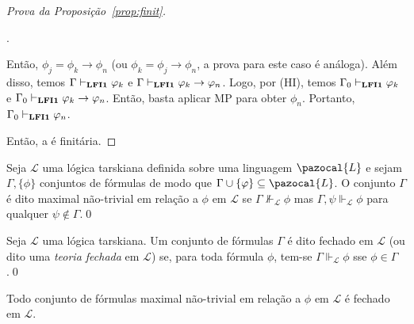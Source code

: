 \begin{proof}[Prova da Proposição~\ref{prop:finit}]
\begin{adjustwidth}{1cm}{}
\begin{provaporcasos}
                    .
                    
                    Então, $\phi_j = \phi_k \to \phi_n$ (ou $\phi_k = \phi_j \to \phi_n$, a prova para este caso é análoga). Além disso, temos $\Gamma \vdash_{{\normalfont\textbf{LFI1}}{}} \varphi_k$ e $\Gamma \vdash_{{\normalfont\textbf{LFI1}}{}} \varphi_k \to \varphi_n$. Logo, por (HI), temos $\Gamma_0 \vdash_{{\normalfont\textbf{LFI1}}{}} \varphi_k$ e $\Gamma_0 \vdash_{{\normalfont\textbf{LFI1}}{}} \varphi_k \to \varphi_n$. Então, basta aplicar MP para obter $\phi_n$. Portanto, $\Gamma_0 \vdash_{{\normalfont\textbf{LFI1}}{}} \varphi_n$.
                \end{provaporcasos}
            \end{adjustwidth}
            Então, a \lfium{} é finitária. \qedhere

        \end{proof}



        \begin{definicao}\label{def:nao-trivial_maximal}
            Seja $\mathcal{L}$ uma lógica tarskiana definida sobre uma linguagem $\pazocal{L}$ e sejam $\Gamma, \{\phi\}$ conjuntos de fórmulas de modo que $\Gamma \cup \{\phi\} \subseteq \pazocal{L}$. O conjunto $\Gamma$ é dito maximal não-trivial em relação a $\phi$ em $\mathcal{L}$ se $\Gamma \nVdash_{\mathcal{L}} \phi$ mas $\Gamma, \psi \Vdash_{\mathcal{L}} \phi$ para qualquer $\psi \notin \Gamma$.\qed{}
        \end{definicao}

        \begin{definicao}\label{def:fechada}

            Seja $\mathcal{L}$ uma lógica tarskiana. Um conjunto de fórmulas $\Gamma$ é dito fechado em $\mathcal{L}$ (ou dito uma \textit{teoria fechada} em $\mathcal{L}$) se, para toda fórmula $\phi$, tem-se $\Gamma \Vdash_{\mathcal{L}} \phi$ sse $\phi \in \Gamma$.\qed{}
        \end{definicao}

        \begin{lema}\label{lem:nao_trivial_maximal_fechado}
            Todo conjunto de fórmulas maximal não-trivial em relação a $\phi$ em $\mathcal{L}$ é fechado em $\mathcal{L}$.
        \end{lema}

